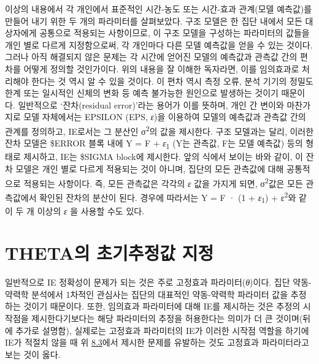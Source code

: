 \documentclass[
  11pt,
  krantz2,
  a4paper]{krantz}
\theoremstyle{definition}
\theoremstyle{definition}
\theoremstyle{definition}
\theoremstyle{remark}
\begin{document}
이상의 내용에서 각 개인에서 표준적인 시간-농도 또는 시간-효과 관계(모델 예측값)를 만들어 내기 위한 두 개의 파라미터를 살펴보았다. 구조 모델은 한 집단 내에서 모든 대상자에게 공통으로 적용되는 사항이므로, 이 구조 모델을 구성하는 파라미터의 값들을 개인 별로 다르게 지정함으로써, 각 개인마다 다른 모델 예측값을 얻을 수 있는 것이다. 그러나 아직 해결되지 않은 문제는 각 시간에 얻어진 모델의 예측값과 관측값 간의 편차를 어떻게 정의할 것인가이다. 위의 내용을 잘 이해한 독자라면, 이를 임의효과로 처리해야 한다는 것 역시 알 수 있을 것이다. 이 편차 역시 측정 오류, 분석 기기의 정밀도 한계 또는 일시적인 신체의 변화 등 예측 불가능한 원인으로 발생하는 것이기 때문이다. 일반적으로 `잔차(residual error)'라는 용어가 이를 뜻하며, 개인 간 변이와 마찬가지로 모델 자체에서는 EPSILON (EPS, \emph{ε})을 이용하여 모델의 예측값과 관측값 간의 관계를 정의하고, IE로서는 그 분산인 σ\textsuperscript{2}의 값을 제시한다. 구조 모델과는 달리, 이러한 잔차 모델은 \$ERROR 블록 내에 Y = F + \emph{ε}\textsubscript{1} (Y는 관측값, F는 모델 예측값) 등의 형태로 제시하고, IE는 \$SIGMA block에 제시한다. 앞의 식에서 보이는 바와 같이, 이 잔차 모델은 개인 별로 다르게 적용되는 것이 아니며, 집단의 모든 관측값에 대해 공통적으로 적용되는 사항이다. 즉, 모든 관측값은 각각의 \emph{ε} 값을 가지게 되면, σ\textsuperscript{2}값은 모든 관측값에서 확인된 잔차의 분산이 된다. 경우에 따라서는 Y = F · (1 + \emph{ε}\textsubscript{1}) + ε\textsuperscript{2}와 같이 두 개 이상의 \emph{ε} 을 사용할 수도 있다.

\hypertarget{thetauxc758-uxcd08uxae30uxcd94uxc815uxac12-uxc9c0uxc815}{%
\section{THETA의 초기추정값 지정}\label{thetauxc758-uxcd08uxae30uxcd94uxc815uxac12-uxc9c0uxc815}}

일반적으로 IE 정확성이 문제가 되는 것은 주로 고정효과 파라미터(\emph{θ})이다. 집단 약동-약력학 분석에서 1차적인 관심사는 집단의 대표적인 약동-약력학 파라미터 값을 추정하는 것이기 때문이다. 또한, 임의효과 파라미터에 대해 IE를 제시하는 것은 추정의 시작점을 제시한다기보다는 해당 파라미터의 추정을 허용한다는 의미가 더 큰 것이며(뒤에 추가로 설명함), 실제로는 고정효과 파라미터의 IE가 이러한 시작점 역할을 하기에 IE가 적절치 않을 때 위 \protect\hyperlink{fixed-random-meaning}{8.3}에서 제시한 문제를 유발하는 것도 고정효과 파라미터라고 보는 것이 옳다.
\end{document}
